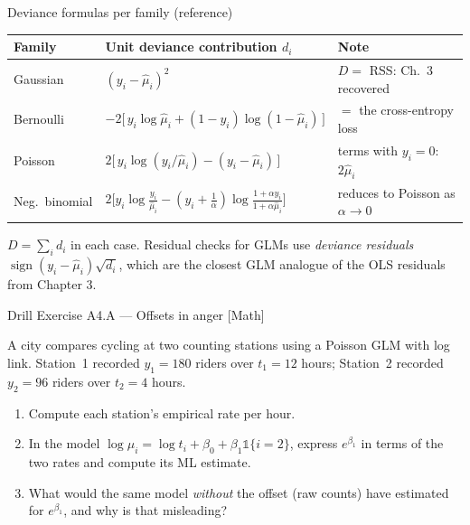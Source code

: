 \documentclass[aspectratio=169,11pt]{beamer}
\begin{document}
\begin{frame}{Deviance formulas per family (reference)}
  \footnotesize
  \begin{center}
  \begin{tabular}{@{}lll@{}}
    \toprule
    \textbf{Family} & \textbf{Unit deviance contribution $d_i$} & \textbf{Note} \\
    \midrule
    Gaussian & $(y_i - \hat\mu_i)^2$ & $D = $ RSS: Ch.\ 3 recovered \\
    Bernoulli & $-2\big[\,y_i\log\hat\mu_i + (1-y_i)\log(1-\hat\mu_i)\,\big]$ & $=$ the cross-entropy loss \\
    Poisson & $2\big[\,y_i\log(y_i/\hat\mu_i) - (y_i - \hat\mu_i)\,\big]$ & terms with $y_i=0$: $2\hat\mu_i$ \\
    Neg.\ binomial & $2\big[ y_i\log\frac{y_i}{\hat\mu_i} - (y_i + \tfrac1\alpha)\log\frac{1+\alpha y_i}{1+\alpha\hat\mu_i} \big]$ & reduces to Poisson as $\alpha\to 0$ \\
    \bottomrule
  \end{tabular}
  \end{center}
  \begin{readme}
    $D = \sum_i d_i$ in each case. Residual checks for GLMs use \emph{deviance
    residuals} $\operatorname{sign}(y_i - \hat\mu_i)\sqrt{d_i}$, which are the closest
    GLM analogue of the OLS residuals from Chapter 3.
  \end{readme}
\end{frame}

\begin{frame}{Drill Exercise A4.A --- Offsets in anger [Math]}
\begin{exercise}
  A city compares cycling at two counting stations using a Poisson GLM with log link.
  Station~1 recorded $y_1 = 180$ riders over $t_1 = 12$ hours; Station~2 recorded
  $y_2 = 96$ riders over $t_2 = 4$ hours.
  \begin{enumerate}
    \item Compute each station's empirical rate per hour.
    \item In the model $\log\mu_i = \log t_i + \beta_0 + \beta_1 \mathbb{1}\{i=2\}$,
          express $e^{\beta_1}$ in terms of the two rates and compute its ML estimate.
    \item What would the same model \emph{without} the offset (raw counts) have
          estimated for $e^{\beta_1}$, and why is that misleading?
  \end{enumerate}
\end{exercise}
\end{frame}
\end{document}

